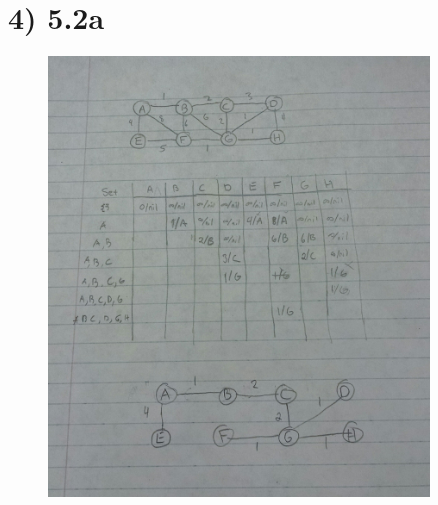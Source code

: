 \documentclass[a4paper]{article}
\begin{document}
\section*{4) 5.2a}
\begin{figure}[H]
\centering
\includegraphics[width=0.9\textwidth]{Prims.jpg}
\end{figure}
\end{document}
